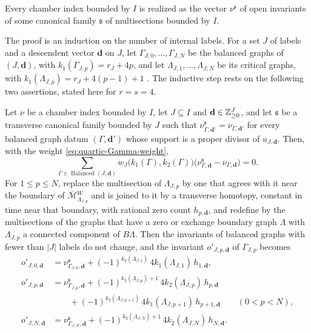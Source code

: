 \begin{importedthm}
Every chamber index bounded by $I$ is realized as the vector
$\nu^{\mathfrak s}$ of open invariants of some canonical family $\mathfrak s$
of multisections bounded by $I$.
\end{importedthm}

The proof is an induction on the number of internal labels.  For a set $J$
of labels and a descendent vector $\mathbf d$ on $J$, let
$\Gamma_{J,0},\dots,\Gamma_{J,N}$ be the balanced graphs of $(J,\mathbf d)$,
with $k_1(\Gamma_{J,p})=r_J+4p$, and let $\Lambda_{J,1},\dots,\Lambda_{J,N}$
be its critical graphs, with $k_1(\Lambda_{J,p})=r_J+4(p-1)+1$
\cite[Notation~2.40]{grossetal2022open}.  The inductive step rests on the
following two assertions, stated here for $r=s=4$.

\begin{importedthm}
Let $\nu$ be a chamber index bounded by $I$, let $J\subseteq I$ and
$\mathbf d\in\mathbb Z^J_{\geq0}$, and let $\mathfrak s$ be a transverse
canonical family bounded by $J$ such that $\nu^{\mathfrak s}_{\Gamma,\mathbf
d'}=\nu_{\Gamma,\mathbf d'}$ for every balanced graph datum
$(\Gamma,\mathbf d')$ whose support is a proper divisor of
$u_{J,\mathbf d}$.  Then, with the weight
\eqref{eq:quartic-Gamma-weight},
\[
 \sum_{\Gamma\in\operatorname{Balanced}(J,\mathbf d)}
 w_J\bigl(k_1(\Gamma),k_2(\Gamma)\bigr)
 \bigl(\nu^{\mathfrak s}_{\Gamma,\mathbf d}-\nu_{\Gamma,\mathbf d}\bigr)
 =0.
\]
For $1\leq p\leq N$, replace the multisection of $\Lambda_{J,p}$ by one that
agrees with it near the boundary of $\overline{\mathcal
M}{}^W_{\Lambda_{J,p}}$ and is joined to it by a transverse homotopy,
constant in time near that boundary, with rational zero count
$h_{p,\mathbf d}$, and redefine by \cite[Lem.~5.15]{grossetal2022open} the
multisections of the graphs that have a zero or exchange boundary graph
$\Lambda$ with $\Lambda_{J,p}$ a connected component of $B\Lambda$.  Then the
invariants of balanced graphs with fewer than $|J|$ labels do not change, and
the invariant $o'_{J,p,\mathbf d}$ of $\Gamma_{J,p}$ becomes
\begin{align*}
 o'_{J,0,\mathbf d}
 &=\nu^{\mathfrak s}_{\Gamma_{J,0},\mathbf d}
  +(-1)^{k_2(\Lambda_{J,1})}\,4k_1(\Lambda_{J,1})\,h_{1,\mathbf d},\\
 o'_{J,p,\mathbf d}
 &=\nu^{\mathfrak s}_{\Gamma_{J,p},\mathbf d}
  +(-1)^{k_2(\Lambda_{J,p})+1}\,4k_2(\Lambda_{J,p})\,h_{p,\mathbf d}\\
 &\qquad+(-1)^{k_2(\Lambda_{J,p+1})}\,4k_1(\Lambda_{J,p+1})\,h_{p+1,\mathbf d}
  \qquad(0<p<N),\\
 o'_{J,N,\mathbf d}
 &=\nu^{\mathfrak s}_{\Gamma_{J,N},\mathbf d}
  +(-1)^{k_2(\Lambda_{J,N})+1}\,4k_2(\Lambda_{J,N})\,h_{N,\mathbf d}.
\end{align*}
\end{importedthm}

